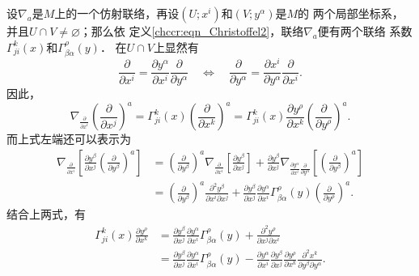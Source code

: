 
设$\nabla_a$是$M$上的一个仿射联络，再设$(U;x^i)$和$(V;y^\alpha)$是$M$的
两个局部坐标系，并且$U\cap V \neq \varnothing$；那么依
定义\eqref{chccr:eqn_Christoffel2}，联络$\nabla_a$便有两个联络
系数$\Gamma^{k}_{ji}(x)$和$\Gamma^{\rho}_{\beta\alpha}(y)$．
在$U\cap V$上显然有
\begin{equation}
    \frac{\partial }{\partial x^i} = \frac{\partial y^\alpha}{\partial x^i}
    \frac{\partial }{\partial y^\alpha} {\quad \Leftrightarrow \quad }
    \frac{\partial }{\partial y^\alpha} = \frac{\partial x^i} {\partial y^\alpha}
    \frac{\partial }{\partial x^i} .
\end{equation}
因此，
\begin{equation*}
    \nabla_{\frac{\partial }{\partial x^i}}\left(\frac{\partial }{\partial x^j}\right) ^a
    =\Gamma^{k}_{ji}(x) \left(\frac{\partial }{\partial x^k}\right) ^a
    =\Gamma^{k}_{ji}(x) \frac{\partial y^\rho}{\partial x^k}
    \left(\frac{\partial }{\partial y^\rho}\right)^a .
\end{equation*}
而上式左端还可以表示为
\begin{align*}
    \nabla_{\frac{\partial }{\partial x^i}}
    \left[\frac{\partial y^\beta}{\partial x^j}
    \left(\frac{\partial }{\partial y^\beta}\right)^a\right]
    &=\left(\frac{\partial }{\partial y^\beta}\right)^a
    \nabla_{\frac{\partial }{\partial x^i}}
    \left[\frac{\partial y^\beta}{\partial x^j} \right]
    +\frac{\partial y^\beta}{\partial x^j}
    \nabla_{\frac{\partial y^\alpha}{\partial x^i}
        \frac{\partial }{\partial y^\alpha} }
    \left[\left(\frac{\partial }{\partial y^\beta}\right)^a\right]  \\
    &=\left(\frac{\partial }{\partial y^\beta}\right)^a
    \frac{\partial^2 y^\beta}{\partial x^i \partial x^j}
    +\frac{\partial y^\beta}{\partial x^j} \frac{\partial y^\alpha}{\partial x^i}
    \Gamma^{\rho}_{\beta\alpha}(y)
    \left(\frac{\partial }{\partial y^\rho}\right)^a  .
\end{align*}
结合上两式，有
\begin{subequations}\label{chccr:eqn_Exchange-Christoffel}
    \begin{align}
        \Gamma^{k}_{ji}(x) \frac{\partial y^\rho}{\partial x^k} &=
        \frac{\partial y^\beta}{\partial x^j} \frac{\partial y^\alpha}{\partial x^i}
        \Gamma^{\rho}_{\beta\alpha}(y) + \frac{\partial^2 y^\rho}{\partial x^j \partial x^i}
          \label{chccr:eqn_Exchange-Christoffel-a}\\
        &= \frac{\partial y^\beta}{\partial x^j} \frac{\partial y^\alpha}{\partial x^i}
        \Gamma^{\rho}_{\beta\alpha}(y)
        -\frac{\partial y^\alpha }{\partial {x^i}}\frac{\partial {y^\beta }}{\partial {x^j}}
        \frac{\partial {y^\rho }}{\partial {x^k}}\frac{{{\partial ^2}{x^k}}}
        {\partial {y^\beta }\partial {y^\alpha }} . \label{chccr:eqn_Exchange-Christoffel-b}
    \end{align}
\end{subequations}
